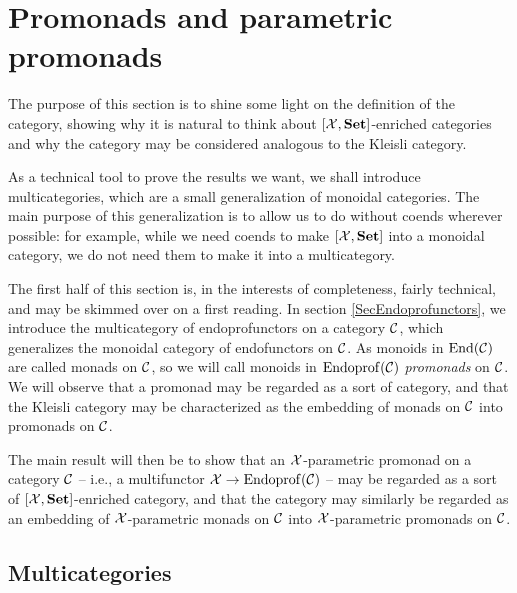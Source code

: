 \documentclass{article}
\begin{document}
\section{Promonads and parametric promonads}
\label{SecPromonads}

The purpose of this section is to shine some light on the definition of the \Mellies category, showing why it is natural to think about $[\mathcal X,{\normalfont\textbf{Set}}]$-enriched categories and why the \Mellies category may be considered analogous to the Kleisli category.

As a technical tool to prove the results we want, we shall introduce multicategories, which are a small generalization of monoidal categories.  
The main purpose of this generalization is to allow us to do without coends wherever possible: for example, while we need coends to make $[\mathcal X,{\normalfont\textbf{Set}}]$ into a monoidal category, we do not need them to make it into a multicategory.  

The first half of this section is, in the interests of completeness, fairly technical, and may be skimmed over on a first reading.  
In section \ref{SecEndoprofunctors}, we introduce the multicategory of endoprofunctors on a category ${\mathcal{C}}$, which generalizes the monoidal category of endofunctors on ${\mathcal{C}}$.  
As monoids in $\operatorname{End}({\mathcal{C}})$ are called monads on ${\mathcal{C}}$, so we will call monoids in $\operatorname{Endoprof}({\mathcal{C}})$ \emph{promonads} on ${\mathcal{C}}$.  
We will observe that a promonad may be regarded as a sort of category, and that the Kleisli category may be characterized as the embedding of monads on ${\mathcal{C}}$ into promonads on ${\mathcal{C}}$.  

The main result will then be to show that an $\mathcal X$-parametric promonad on a category ${\mathcal{C}}$ -- i.e., a multifunctor $\mathcal X \to \operatorname{Endoprof}({\mathcal{C}})$ -- may be regarded as a sort of $[\mathcal X,{\normalfont\textbf{Set}}]$-enriched category, and that the \Mellies category may similarly be regarded as an embedding of $\mathcal X$-parametric monads on ${\mathcal{C}}$ into $\mathcal X$-parametric promonads on ${\mathcal{C}}$.

\subsection{Multicategories}
\end{document}
